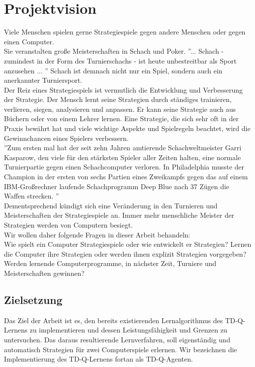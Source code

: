 \chapter{Projektvision}
\label{cha:projektvision}

Viele Menschen spielen gerne Strategiespiele gegen andere Menschen oder gegen einen Computer. \\
Sie veranstalten große Meisterschaften in Schach und Poker. ''... Schach - zumindest in der Form des Turnierschachs - ist heute unbestreitbar als Sport anzusehen ... \cite{Weyer}'' Schach ist demnach nicht nur ein Spiel, sondern auch ein anerkannter Turniersport. \\

Der Reiz eines Strategiespiels ist vermutlich die Entwicklung und Verbesserung der Strategie. Der Mensch lernt seine Strategien durch ständiges trainieren, verlieren, siegen, analysieren und anpassen. Er kann seine Strategie auch aus Büchern oder von einem Lehrer lernen.
Eine Strategie, die sich sehr oft in der Praxis bewährt hat und viele wichtige Aspekte und Spielregeln beachtet, wird die Gewinnchancen eines Spielers verbessern. \\

''Zum ersten mal hat der seit zehn Jahren amtierende Schachweltmeister Garri Kasparow, den viele für den stärksten Spieler aller Zeiten halten, eine normale Turnierpartie gegen einen Schachcomputer verloren. 
In Philadelphia musste der Champion in der ersten von sechs Partien eines Zweikampfs gegen das auf einem IBM-Großrechner laufende Schachprogramm Deep Blue nach 37 Zügen die Waffen strecken. \cite{Neander}''\\

Dementsprechend kündigt sich eine Veränderung in den Turnieren und Meisterschaften der Strategiespiele an. Immer mehr menschliche Meister der Strategien werden von Computern besiegt. \\

Wir wollen daher folgende Fragen in dieser Arbeit behandeln:\\
Wie spielt ein Computer Strategiespiele oder wie entwickelt er Strategien? Lernen die Computer ihre Strategien oder werden ihnen explizit Strategien vorgegeben? Werden lernende Computerprogramme, in nächster Zeit, Turniere und Meisterschaften gewinnen? 
\newpage

\section{Zielsetzung}
Das Ziel der Arbeit ist es, den bereits existierenden Lernalgorithmus des TD-Q-Lernens zu implementieren und dessen Leistungsfähigkeit und Grenzen zu untersuchen. Das daraus resultierende Lernverfahren, soll eigenständig und automatisch Strategien für zwei Computerspiele erlernen. Wir bezeichnen die Implementierung des TD-Q-Lernens fortan als TD-Q-Agenten. \\

